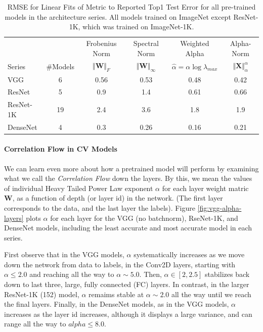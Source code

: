 \begin{table}[t]
\small
\begin{center}
\begin{tabular}{|p{1in}|c|c|c|c|c|}
\hline
   &    & Frobenius Norm & Spectral Norm & Weighted Alpha & Alpha-Norm \\
 Series & \#Models   & $\Vert\mathbf{W}\Vert_{F}$ & $\Vert\mathbf{W}\Vert_{\infty}$ & $\hat{\alpha}=\alpha\log\lambda_{max}$ & $\Vert\mathbf{X}\Vert^{\alpha}_{\alpha}$ \\
\hline
 VGG & 6 & 0.56 & 0.53 & 0.48 & 0.42  \\
 ResNet & 5 & 0.9 & 1.4 & 0.61 & 0.66  \\
 ResNet-1K & 19 & 2.4 & 3.6 & 1.8 & 1.9  \\
 DenseNet & 4 & 0.3 & 0.26 & 0.16 & 0.21 \\
\hline
\end{tabular}
\end{center}
\caption{RMSE for Linear Fits of Metric to Reported Top1 Test Error for all pre-trained models in the architecture series.  All models trained on ImageNet except ResNet-1K, which was trained on ImageNet-1K. }
\label{table:cv-models}
\end{table}


\paragraph{Correlation Flow in CV Models}

We can learn even more about how a pretrained model will perform by examining what we call the
\emph{Correlation Flow} down the layers.  By this, we mean the values of individual Heavy Tailed
Power Law exponent $\alpha$ for each layer weight matric $\mathbf{W}$, as a function of depth
(or layer id) in the network. (The first layer corresponds to the data, and the last layer the labels).
Figure \ref{fig:vgg-alpha-layers} plots $\alpha$ for each layer for the VGG (no batchnorm), RseNet-1K, and DenseNet models,
including the least accurate and most accurate model in each series. 

First observe that in the VGG models, $\alpha$ systematically increases as we move down the network from data to labels,
in the Conv2D layers, starting with $\alpha\le 2.0$ and reaching all the way to $\alpha\sim 5.0$.
Then, $\alpha\in[2,2.5]$ stabilizes back down to last three, large,  fully connected (FC) layers. 
In contrast, in the larger ResNet-1K (152) model, $\alpha$ remaims stable at $\alpha\sim 2.0$ all the way
until we reach the final layers.  Finally, in the DenseNet models, as in the VGG models, $\alpha$ increases
as the layer id increases, although it displays a large variance, and can range all the way to $alpha\le 8.0$.


